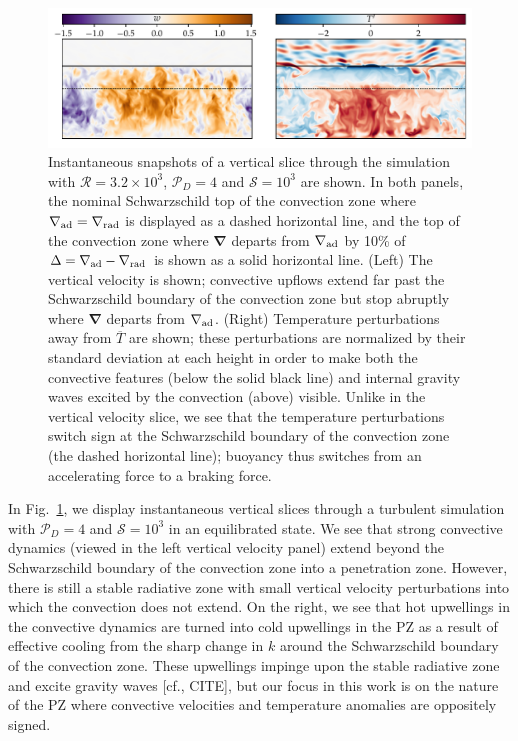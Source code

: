 \documentclass{aastex631}
\newcommand{\gradrad}{\ensuremath{\nabla_{\rm{rad}}}}
\newcommand{\gradad}{\ensuremath{\nabla_{\rm{ad}}}}
\newcommand{\mP}{\ensuremath{\mathcal{P}}}
\newcommand{\mR}{\ensuremath{\mathcal{R}}}
\newcommand{\mS}{\ensuremath{\mathcal{S}}}
\renewcommand{\vec}[1]{\boldsymbol{#1}}
\newcommand{\grad}{\vec{\nabla}}
\begin{document}
\begin{figure}[t!]
\centering
\includegraphics[width=\textwidth]{vertical_dynamics_panels.pdf}
\caption{
Instantaneous snapshots of a vertical slice through the simulation with $\mR = 3.2 \times 10^3$, $\mP_D = 4$ and $\mS = 10^3$ are shown.
In both panels, the nominal Schwarzschild top of the convection zone where $\gradad = \gradrad$ is displayed as a dashed horizontal line, and the top of the convection zone where $\grad$ departs from $\gradad$ by 10\% of $\Delta = \gradad - \gradrad$ is shown as a solid horizontal line.
(Left) The vertical velocity is shown; convective upflows extend far past the Schwarzschild boundary of the convection zone but stop abruptly where $\grad$ departs from $\gradad$.
(Right) Temperature perturbations away from $\overline{T}$ are shown; these perturbations are normalized by their standard deviation at each height in order to make both the convective features (below the solid black line) and internal gravity waves excited by the convection (above) visible.
Unlike in the vertical velocity slice, we see that the temperature perturbations switch sign at the Schwarzschild boundary of the convection zone (the dashed horizontal line); buoyancy thus switches from an accelerating force to a braking force.
\label{fig:vertical_dynamics_panels}
}
\end{figure}

In Fig.~\ref{fig:vertical_dynamics_panels}, we display instantaneous vertical slices through a turbulent simulation with $\mP_D = 4$ and $\mS = 10^3$ in an equilibrated state.
We see that strong convective dynamics (viewed in the left vertical velocity panel) extend beyond the Schwarzschild boundary of the convection zone into a penetration zone.
However, there is still a stable radiative zone with small vertical velocity perturbations into which the convection does not extend.
On the right, we see that hot upwellings in the convective dynamics are turned into cold upwellings in the PZ as a result of effective cooling from the sharp change in $k$ around the Schwarzschild boundary of the convection zone.
These upwellings impinge upon the stable radiative zone and excite gravity waves [cf., CITE], but our focus in this work is on the nature of the PZ where convective velocities and temperature anomalies are oppositely signed.
\end{document}
